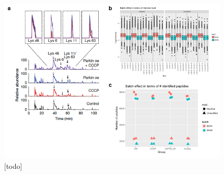 \documentclass[mcp]{article}
\numberwithin{figure}{section} %
\numberwithin{table}{section}
\def\todo#1{{\color{red}[#1]}}
\begin{document}
\begin{figure}[ht]
\centering
\includegraphics[scale=.8]{images/fig2.png}
\caption{\todo{todo}}
\label{fig:batch}
\end{figure}
\end{document}
